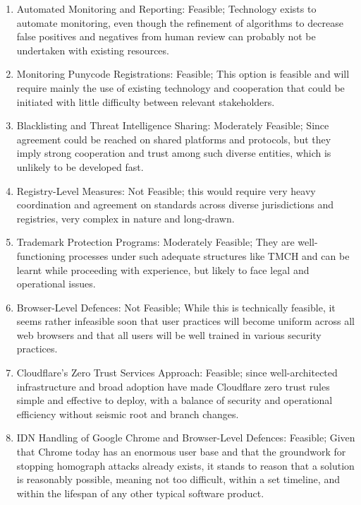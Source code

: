  \begin{enumerate}
  \item Automated Monitoring and Reporting: Feasible; Technology exists to automate monitoring, even though the refinement of algorithms to decrease false positives and negatives from human review can probably not be undertaken with existing resources.
  \item  Monitoring Punycode Registrations: Feasible; This option is feasible and will require mainly the use of existing technology and cooperation that could be initiated with little difficulty between relevant stakeholders.
  \item Blacklisting and Threat Intelligence Sharing: Moderately Feasible; Since agreement could be reached on shared platforms and protocols, but they imply strong cooperation and trust among such diverse entities, which is unlikely to be developed fast.
  \item Registry-Level Measures: Not Feasible; this would require very heavy coordination and agreement on standards across diverse jurisdictions and registries, very complex in nature and long-drawn.
  \item Trademark Protection Programs: Moderately Feasible; They are well-functioning processes under such adequate structures like TMCH and can be learnt while proceeding with experience, but likely to face legal and operational issues.
  \item  Browser-Level Defences: Not Feasible; While this is technically feasible, it seems rather infeasible soon that user practices will become uniform across all web browsers and that all users will be well trained in various security practices.
  \item Cloudflare's Zero Trust Services Approach: Feasible; since well-architected infrastructure and broad adoption have made Cloudflare zero trust rules simple and effective to deploy, with a balance of security and operational efficiency without seismic root and branch changes.
  \item IDN Handling of Google Chrome and Browser-Level Defences: Feasible; Given that Chrome today has an enormous user base and that the groundwork for stopping homograph attacks already exists, it stands to reason that a solution is reasonably possible, meaning not too difficult, within a set timeline, and within the lifespan of any other typical software product.

  
\end{enumerate}

